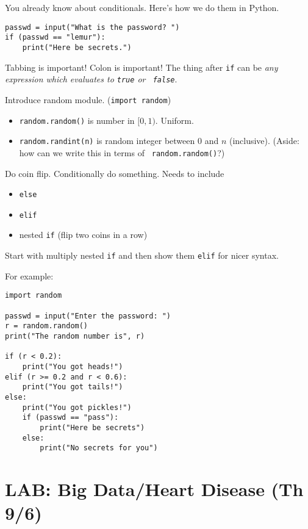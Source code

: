 \documentclass{article}
\begin{document}
You already know about conditionals.  Here's how we do them in Python.

\begin{verbatim}
passwd = input("What is the password? ")
if (passwd == "lemur"):
    print("Here be secrets.")
\end{verbatim}

Tabbing is important!  Colon is important!  The thing after {\tt if}
can be \emph{any expression which evaluates to {\tt true} or {\tt
    false}}.

Introduce random module. ({\tt import random})
\begin{itemize}
\item {\tt random.random()} is number in $[0,1)$. Uniform.
\item {\tt random.randint(n)} is random integer between $0$ and $n$
  (inclusive).  (Aside: how can we write this in terms of {\tt
    random.random()}?)
\end{itemize}
Do coin flip.  Conditionally do something.  Needs to include
\begin{itemize}
\item {\tt else}
\item {\tt elif}
\item nested {\tt if}  (flip two coins in a row)
\end{itemize}

Start with multiply nested {\tt if} and then show them {\tt elif} for
nicer syntax.

For example:
\begin{verbatim}
import random

passwd = input("Enter the password: ")
r = random.random()
print("The random number is", r)

if (r < 0.2):
    print("You got heads!")
elif (r >= 0.2 and r < 0.6):
    print("You got tails!")
else:
    print("You got pickles!")
    if (passwd == "pass"):
        print("Here be secrets")
    else:
        print("No secrets for you")
\end{verbatim}

\newpage
\section*{LAB: Big Data/Heart Disease (Th 9/6)}
\end{document}
